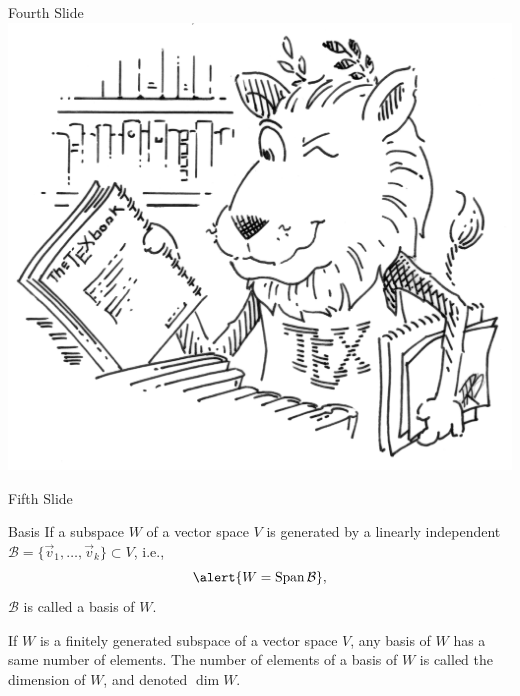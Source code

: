 \documentclass{beamer}
\begin{document}
\begin{frame}{Fourth Slide}
  \includegraphics[width=\textwidth]{tex-lion}
\end{frame}
\begin{frame}{Fifth Slide}
  \begin{block}{Basis}
    If a subspace $W$ of a vector space $V$ is generated by a linearly
    independent $\mathcal B = \{\vec v_1, \dots, \vec v_k\} \subset V$, i.e.,
    \begin{equation*}
      \alert{W = \textrm{Span}\,\mathcal B},
    \end{equation*}
    $\mathcal B$ is called a \alert{basis} of $W$.
  \end{block}
  \begin{theorem}
    If $W$ is a \alert{finitely generated} subspace of a vector space $V$,
    any basis of $W$ has a \alert{same number of elements}.
    The number of elements of a basis of $W$ is called the \alert{dimension} 
    of $W$, and denoted \alert{$\dim W$}.
  \end{theorem}
\end{frame}
\end{document}
